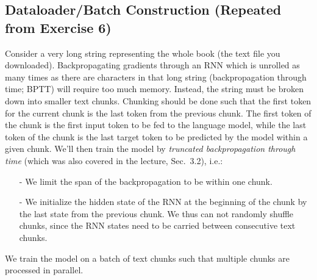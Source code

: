 \documentclass[a4paper,11pt]{article}
\begin{document}
\subsection{Dataloader/Batch Construction (Repeated from Exercise 6)}
Consider a very long string representing the whole book
(the text file you downloaded). Backpropagating gradients through an RNN
which is unrolled as many times as there are characters in that long string
(backpropagation through time; BPTT) will require too much memory.
Instead, the string must be broken down into smaller text chunks.
Chunking should be done such that the first token for the current chunk is the
last token from the previous chunk.
The first token of the chunk is the first input token to be fed to the language
model, while the last token of the chunk is the last target token to be
predicted by the model within a given chunk.
We'll then train the model by \emph{truncated backpropagation through time}
(which was also covered in the lecture, Sec.~3.2), i.e.:
\begin{itemize}
\item[-] We limit the span of the backpropagation to be within one chunk.
\item[-] We initialize the hidden state of the RNN at the beginning of the chunk by the last state from the previous chunk.
We thus can not randomly shuffle chunks, since the RNN states need to be carried between consecutive text chunks.
\end{itemize}
We train the model on a batch of text chunks such that multiple chunks are processed in parallel.
\end{document}
